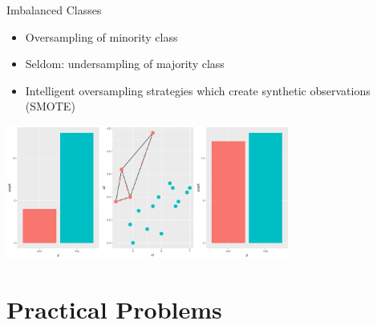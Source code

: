 \begin{frame}{Imbalanced Classes}
  \begin{itemize}
    \item Oversampling of minority class
    \item Seldom: undersampling of majority class
    \item Intelligent oversampling strategies which create
        synthetic observations (SMOTE) 
  \end{itemize}
      \begin{center}
        \includegraphics[width= 0.7\textwidth]{images/smote.png}
      \end{center}
\end{frame}

\section{Practical Problems}

